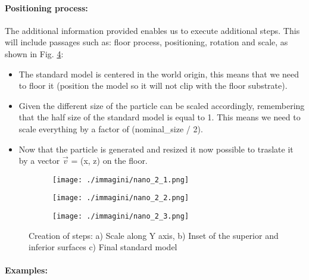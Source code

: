 \paragraph{Positioning process: }

The additional information provided enables us to execute additional steps. This will include passages such as: floor process, positioning, rotation and scale, as shown in Fig. \ref{fig:nano_pos}:


\begin{itemize}
    \item The standard model is centered in the world origin, this means that we need to floor it (position the model so it will not clip with the floor substrate).
    \item Given the different size of the particle can be scaled accordingly, remembering that the half size of the standard model is equal to 1. This means we need to scale everything by a factor of (nominal\_size / 2).
    \item Now that the particle is generated and resized it now possible to traslate it by a vector $\vec{v}$ = (x, z) on the floor.
\end{itemize}

\begin{figure}[ht]
    \centering
    \begin{subfigure}[b]{0.32\textwidth}
        \texttt{[image: ./immagini/nano\_2\_1.png]}
        \caption{}
        \label{fig:nano_pos_a}
    \end{subfigure}
    \hfill
    \begin{subfigure}[b]{0.32\textwidth}
        \texttt{[image: ./immagini/nano\_2\_2.png]}
        \caption{}
        \label{fig:nano_pos_b}
    \end{subfigure}
    \hfill
    \begin{subfigure}[b]{0.32\textwidth}
        \texttt{[image: ./immagini/nano\_2\_3.png]}
        \caption{}
        \label{fig:nano_pos_c}
    \end{subfigure}
    \caption{Creation of steps: a) Scale along Y axis, b) Inset of the superior and inferior surfaces c) Final standard model}
    \label{fig:nano_pos}
\end{figure}

\newpage

\paragraph{Examples: }

